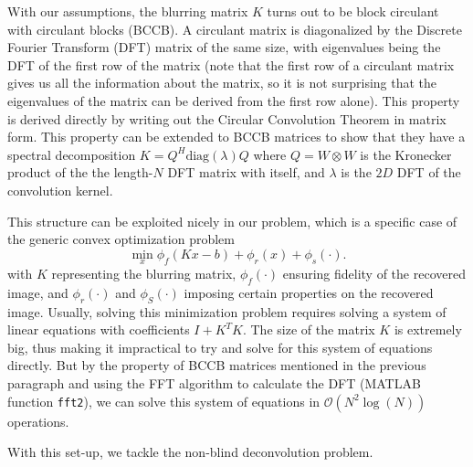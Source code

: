 \documentclass[12pt]{article}
\begin{document}
With our assumptions, the blurring matrix $K$ turns out to be block circulant with circulant blocks (BCCB). A circulant matrix is diagonalized by the Discrete Fourier Transform (DFT) matrix of the same size, with eigenvalues being the DFT of the first row of the matrix (note that the first row of a circulant matrix gives us all the information about the matrix, so it is not surprising that the eigenvalues of the matrix can be derived from the first row alone). This property is derived directly by writing out the Circular Convolution Theorem in matrix form. This property can be extended to BCCB matrices to show that they have a spectral decomposition $K = Q^{H}\text{diag}(\lambda)Q$ where $Q = W\otimes W$ is the Kronecker product of the the length-$N$ DFT matrix with itself, and $\lambda$ is the $2D$ DFT of the convolution kernel.

This structure can be exploited nicely in our problem, which is a specific case of the generic convex optimization problem 
\[ \min_{x} \phi_f(Kx-b) + \phi_r(x) + \phi_s(\cdot). \]
with $K$ representing the blurring matrix, $\phi_f(\cdot)$ ensuring
fidelity of the recovered image, and $\phi_r(\cdot)$ and $\phi_S(\cdot)$ imposing certain properties on the recovered image. Usually,
solving this minimization problem requires solving a system of linear
equations with coefficients $I + K^{T}K$. The size of the matrix $K$ is extremely big, thus making it impractical to try and solve for this system of equations directly. But by the property of BCCB matrices mentioned in the previous paragraph and using the FFT algorithm to calculate the DFT (MATLAB function \texttt{fft2}), we can solve this system of equations in $\mathcal{O}(N^2\log(N))$ operations.

With this set-up, we tackle the non-blind deconvolution problem. 
\end{document}
